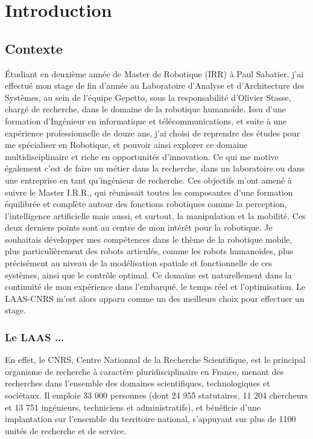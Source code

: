 \documentclass{report}
\begin{document}
\chapter*{Introduction}

\section*{Contexte}

\'{E}tudiant en deuxième année de Master de Robotique (IRR) à Paul Sabatier, j'ai effectué mon stage de fin d'année au Laboratoire d'Analyse et d'Architecture des Systèmes, au sein de l'équipe Gepetto, sous la responsabilité d'Olivier Stasse, chargé de recherche, dans le domaine de la robotique humanoïde. Issu d'une formation d'Ingénieur en informatique et télécommunications, et suite à une expérience professionnelle de douze ans, j'ai choisi de reprendre des études pour me spécialiser en Robotique, et pouvoir ainsi explorer ce domaine multidisciplinaire et riche en opportunités d'innovation. Ce qui me motive également c'est de faire un métier dans la recherche, dans un laboratoire ou dans une entreprise en tant qu'ingénieur de recherche. Ces objectifs m'ont amené à suivre le Master I.R.R., qui réunissait toutes les composantes d'une formation équilibrée et complète autour des fonctions robotiques comme la perception, l'intelligence artificielle mais aussi, et surtout, la manipulation et la mobilité. Ces deux derniers points sont au centre de mon intérêt pour la robotique. Je souhaitais développer mes compétences dans le thème de la robotique mobile, plus particulièrement des robots articulés, comme les robots humanoïdes, plus précisément au niveau de la modélisation spatiale et fonctionnelle de ces systèmes, ainsi que le contrôle optimal. Ce domaine est naturellement dans la continuïté de mon expérience dans l'embarqué, le temps réel et l'optimisation. Le LAAS-CNRS m'est alors apparu comme un des meilleurs choix pour effectuer un stage.

\subsection*{Le LAAS ...}
En effet, le CNRS, Centre Nationnal de la Recherche Scientifique, est le principal organisme de recherche à caractère pluridisciplinaire en France, menant des recherches dans l'ensemble des domaines scientifiques, technologiques et sociétaux. Il emploie 33 000 personnes (dont 24 955 statutaires, 11 204 chercheurs et 13 751 ingénieurs, techniciens et administratifs), et bénéficie d'une implantation sur l'ensemble du territoire national, s'appuyant sur plus de 1100 unités de recherche et de service.
\end{document}
